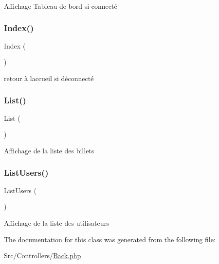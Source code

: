 Affichage Tableau de bord si connecté \mbox{\label{class_src_1_1_controllers_1_1_back_ac36db983080e1b0934908febca5de2d9}} 
\subsubsection{\texorpdfstring{Index()}{Index()}}
{\footnotesize\ttfamily Index (\begin{DoxyParamCaption}{ }\end{DoxyParamCaption})}

retour à l\textquotesingle{}accueil si déconnecté \mbox{\label{class_src_1_1_controllers_1_1_back_a17e6c90f14225bdac5c65ed915b0a2f6}} 
\subsubsection{\texorpdfstring{List()}{List()}}
{\footnotesize\ttfamily List (\begin{DoxyParamCaption}{ }\end{DoxyParamCaption})}

Affichage de la liste des billets \mbox{\label{class_src_1_1_controllers_1_1_back_abfd4f6736a8cd4dc4fa1e012996f4a23}} 
\subsubsection{\texorpdfstring{List\+Users()}{ListUsers()}}
{\footnotesize\ttfamily List\+Users (\begin{DoxyParamCaption}{ }\end{DoxyParamCaption})}

Affichage de la liste des utilisateurs 

The documentation for this class was generated from the following file\+:\begin{DoxyCompactItemize}
\item 
Src/\+Controllers/\hyperlink{_back_8php}{Back.\+php}\end{DoxyCompactItemize}
